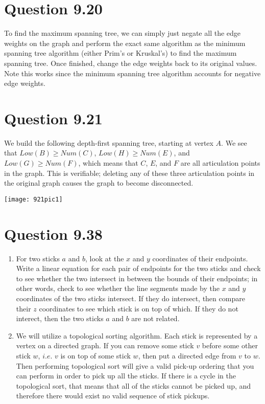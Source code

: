 \documentclass[12pt]{article}
\begin{document}
\section{Question 9.20}
To find the maximum spanning tree, we can simply just negate all the edge weights on the graph and perform the exact same algorithm as the minimum spanning tree algorithm (either Prim's or Kruskal's) to find the maximum spanning tree. Once finished, change the edge weights back to its original values. Note this works since the minimum spanning tree algorithm accounts for negative edge weights.

\newpage

\section{Question 9.21}
We build the following depth-first spanning tree, starting at vertex $A$. We see that $Low(B) \geq Num(C)$, $Low(H) \geq Num(E)$, and $Low(G) \geq Num(F)$, which means that $C$, $E$, and $F$ are all articulation points in the graph. This is verifiable; deleting any of these three articulation points in the original graph causes the graph to become disconnected.
\begin{center}
\texttt{[image: 921pic1]}
\end{center}

\newpage

\section{Question 9.38}
\renewcommand{\theenumi}{\alph{enumi}}
\begin{enumerate}
\item For two sticks $a$ and $b$, look at the $x$ and $y$ coordinates of their endpoints. Write a linear equation for each pair of endpoints for the two sticks and check to see whether the two intersect in between the bounds of their endpoints; in other words, check to see whether the line segments made by the $x$ and $y$ coordinates of the two sticks intersect. If they do intersect, then compare their $z$ coordinates to see which stick is on top of which. If they do not interect, then the two sticks $a$ and $b$ are not related.
\item We will utilize a topological sorting algorithm. Each stick is represented by a vertex on a directed graph. If you can remove some stick $v$ before some other stick $w$, $i.e.$ $v$ is on top of some stick $w$, then put a directed edge from $v$ to $w$. Then performing topological sort will give a valid pick-up ordering that you can perform in order to pick up all the sticks. If there is a cycle in the topological sort, that means that all of the sticks cannot be picked up, and therefore there would exist no valid sequence of stick pickups.
\end{enumerate}
\end{document}
